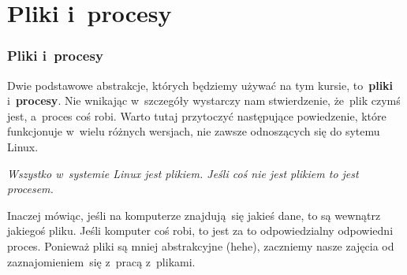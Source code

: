 \documentclass[10pt,t]{beamer}
\begin{document}
\section{Pliki i~procesy}



\begin{frame}
  \frametitle{Pliki i~procesy}


  Dwie podstawowe abstrakcje, których będziemy używać na tym kursie,
  to~\textbf{pliki} i~\textbf{procesy}. Nie wnikając w~szczegóły wystarczy
  nam stwierdzenie, że~plik czymś jest, a~proces coś robi. Warto tutaj
  przytoczyć następujące powiedzenie, które funkcjonuje w~wielu różnych
  wersjach, nie zawsze odnoszących się do sytemu Linux.

  \textit{Wszystko w~systemie Linux jest plikiem. Jeśli coś nie jest
    plikiem to jest procesem.}

  Inaczej mówiąc, jeśli na komputerze znajdują~się jakieś dane, to są
  wewnątrz jakiegoś pliku. Jeśli komputer coś robi, to jest za to
  odpowiedzialny odpowiedni proces. Ponieważ pliki są mniej abstrakcyjne
  (hehe), zaczniemy nasze zajęcia od zaznajomieniem~się z~pracą z~plikami.

\end{frame}



















\end{document}
